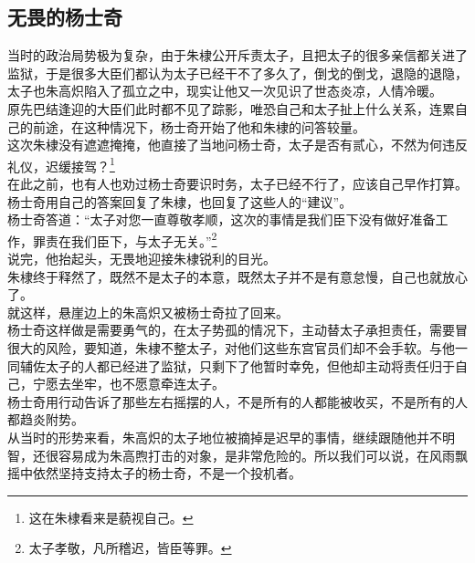 \begin{multicols}{\theparacolNo}
\subsection{无畏的杨士奇}
当时的政治局势极为复杂，由于朱棣公开斥责太子，且把太子的很多亲信都关进了监狱，于是很多大臣们都认为太子已经干不了多久了，倒戈的倒戈，退隐的退隐，太子也朱高炽陷入了孤立之中，现实让他又一次见识了世态炎凉，人情冷暖。\\

原先巴结逢迎的大臣们此时都不见了踪影，唯恐自己和太子扯上什么关系，连累自己的前途，在这种情况下，杨士奇开始了他和朱棣的问答较量。\\

这次朱棣没有遮遮掩掩，他直接了当地问杨士奇，太子是否有贰心，不然为何违反礼仪，迟缓接驾？\footnote{这在朱棣看来是藐视自己。}\\

在此之前，也有人也劝过杨士奇要识时务，太子已经不行了，应该自己早作打算。\\

杨士奇用自己的答案回复了朱棣，也回复了这些人的“建议”。\\

杨士奇答道：“太子对您一直尊敬孝顺，这次的事情是我们臣下没有做好准备工作，罪责在我们臣下，与太子无关。”\footnote{太子孝敬，凡所稽迟，皆臣等罪。}\\

说完，他抬起头，无畏地迎接朱棣锐利的目光。\\

朱棣终于释然了，既然不是太子的本意，既然太子并不是有意怠慢，自己也就放心了。\\

就这样，悬崖边上的朱高炽又被杨士奇拉了回来。\\

杨士奇这样做是需要勇气的，在太子势孤的情况下，主动替太子承担责任，需要冒很大的风险，要知道，朱棣不整太子，对他们这些东宫官员们却不会手软。与他一同辅佐太子的人都已经进了监狱，只剩下了他暂时幸免，但他却主动将责任归于自己，宁愿去坐牢，也不愿意牵连太子。\\

杨士奇用行动告诉了那些左右摇摆的人，不是所有的人都能被收买，不是所有的人都趋炎附势。\\

从当时的形势来看，朱高炽的太子地位被摘掉是迟早的事情，继续跟随他并不明智，还很容易成为朱高煦打击的对象，是非常危险的。所以我们可以说，在风雨飘摇中依然坚持支持太子的杨士奇，不是一个投机者。\\


\end{multicols}
